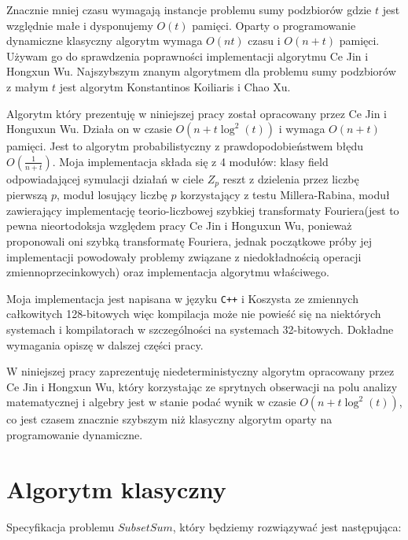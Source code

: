 \documentclass{article}
\begin{document}
Znacznie mniej czasu wymagają instancje problemu sumy podzbiorów gdzie $t$ jest względnie małe i dysponujemy
$O(t)$ pamięci. Oparty o programowanie dynamiczne klasyczny algorytm wymaga $O(nt)$ czasu i $O(n+t)$ pamięci.
Używam go do sprawdzenia poprawności implementacji algorytmu Ce Jin i Hongxun Wu. Najszybszym znanym algorytmem 
dla problemu sumy podzbiorów z małym $t$ jest algorytm Konstantinos Koiliaris i Chao Xu. 

Algorytm który prezentuję w niniejszej pracy został opracowany przez Ce Jin i Honguxun Wu. Działa on w czasie 
$O(n+t\log^2(t))$ i wymaga $O(n+t)$ pamięci. Jest to algorytm probabilistyczny z prawdopodobieństwem błędu $O(\frac{1}{n+t})$.
Moja implementacja składa się z 4 modułów: klasy field odpowiadającej symulacji 
działań w ciele $Z_p$ reszt z dzielenia przez liczbę pierwszą $p$, moduł losujący liczbę $p$ korzystający z testu Millera-Rabina,
moduł zawierający implementację teorio-liczbowej szybkiej transformaty Fouriera(jest to pewna nieortodoksja względem pracy
Ce Jin i Honguxun Wu, ponieważ proponowali oni szybką transformatę Fouriera, jednak początkowe próby jej implementacji
powodowały problemy związane z niedokładnością operacji zmiennoprzecinkowych) oraz implementacja algorytmu właściwego.

Moja implementacja jest napisana w języku \texttt{C++} i Koszysta ze zmiennych całkowitych 128-bitowych więc kompilacja może nie 
powieść się na niektórych systemach i kompilatorach w szczególności na systemach 32-bitowych. Dokładne wymagania opiszę
w dalszej części pracy.

W niniejszej pracy zaprezentuję niedeterministyczny algorytm opracowany przez Ce Jin 
i Hongxun Wu, który korzystając ze sprytnych obserwacji na polu analizy matematycznej i algebry jest w 
stanie podać wynik w czasie $O(n+t\log^2(t))$, co jest czasem znacznie szybszym niż klasyczny algorytm 
oparty na programowanie dynamiczne. 



\section{Algorytm klasyczny}
Specyfikacja problemu $SubsetSum$, który będziemy rozwiązywać jest następująca:
\end{document}

